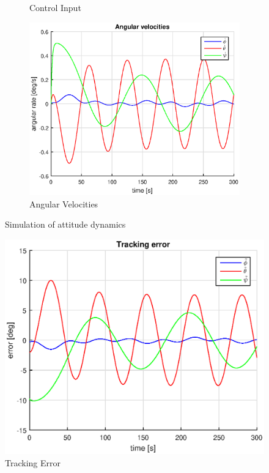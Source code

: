 \begin{figure}[h]
\begin{subfigure}[b]{0.45\textwidth}
        \caption{Control Input}
        \label{fig:input5}
    \end{subfigure}
    \begin{subfigure}[b]{0.45\textwidth}
        \includegraphics[width=\textwidth]{plots/angular_velocities_155.eps}
        \caption{Angular Velocities}
        \label{fig:angular5}
    \end{subfigure}
    \caption{Simulation of attitude dynamics}\label{fig:onefive}
\end{figure}


\begin{figure}[h]
    \centering
    \includegraphics{plots/tracking_error_15.eps}
    \caption{Tracking Error}
    \label{fig:trackerr}
\end{figure}



